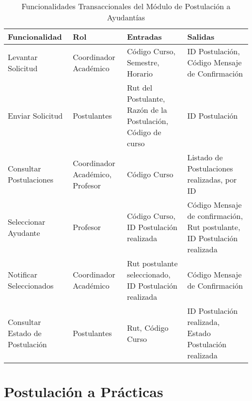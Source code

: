 \documentclass{article}
\begin{document}
\begin{table}[h!]
\centering
\caption{Funcionalidades Transaccionales del Módulo de Postulación a Ayudantías}

\begin{tabular}{|l|p{2.0cm}|p{4.0cm}|p{4.0cm}|}
\hline
Funcionalidad           & Rol                             & Entradas                                      &   Salidas\\ \hline
Levantar Solicitud      & Coordinador Académico           &  Código Curso, Semestre, Horario        & ID Postulación, Código Mensaje de Confirmación  \\ \hline
Enviar Solicitud        & Postulantes                     &  Rut del Postulante, Razón de la Postulación, Código de curso & ID Postulación           \\ \hline
Consultar Postulaciones & Coordinador Académico, Profesor & Código Curso &    Listado de Postulaciones realizadas, por ID \\ \hline
Seleccionar Ayudante    & Profesor                        &  Código Curso, ID Postulación realizada  & Código Mensaje de confirmación, Rut postulante, ID Postulación realizada     \\ \hline
Notificar Seleccionados & Coordinador Académico           &  Rut postulante seleccionado, ID Postulación realizada & Código Mensaje de Confirmación \\ \hline
Consultar Estado de Postulación & Postulantes             &  Rut, Código Curso       &  ID Postulación realizada, Estado Postulación realizada     \\ \hline
\end{tabular}
\end{table}

\section{Postulación a Prácticas}
\end{document}
